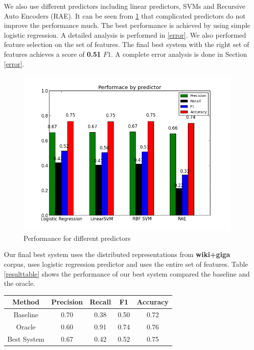 \documentclass[conference]{IEEEtran}
\begin{document}
\indent We also use different predictors including linear predictors, SVMs and Recursive Auto Encoders (RAE). It can be seen from \ref{predSelect} that complicated predictors do not improve the performance much. The best performance is achieved by using simple logistic regression. A detailed analysis is performed in \ref{error}. We also performed feature selection on the set of features. The final best system with the right set of features achieves a score of \textbf{0.51} $F1$. A complete error analysis is done in Section \ref{error}.\\
\begin{figure}
	\centering
	\includegraphics[scale=0.4]{cmp_predictors.png}
	\caption{Performance for different predictors}
	\label{predSelect}
\end{figure}

\indent Our final best system uses the distributed representations from \textbf{wiki+giga} corpus, uses logistic regression predictor and uses the entire set of features. Table \ref{resulttable} shows the performance of our best system compared the baseline and the oracle.

\begin{center}
\label{resulttable}
\begin{tabular}{| c | c | c | c | c |}
\hline
 Method & Precision & Recall & F1 & Accuracy\\ \hline
Baseline & 0.70 & 0.38 & 0.50 & 0.72 \\ \hline
Oracle & 0.60 & 0.91 & 0.74 & 0.76 \\ \hline
Best System & 0.67 & 0.42 & 0.52 & 0.75  \\ 
\hline
\end{tabular}
\end{center}
\end{document}

